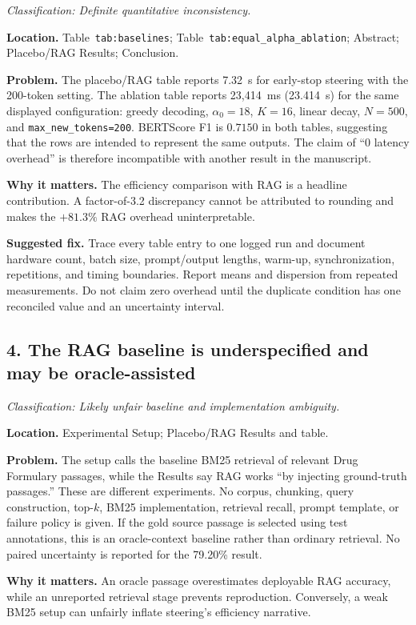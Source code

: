 \documentclass[11pt]{article}
\newcommand{\findinglabel}[1]{\textbf{#1}}
\newcommand{\classification}[1]{\textit{Classification: #1.}}
\begin{document}
\classification{Definite quantitative inconsistency}

\findinglabel{Location.} Table~\texttt{tab:baselines}; Table~\texttt{tab:equal\_alpha\_ablation}; Abstract; Placebo/RAG Results; Conclusion.

\findinglabel{Problem.} The placebo/RAG table reports 7.32~s for early-stop steering with the 200-token setting.  The ablation table reports 23,414~ms (23.414~s) for the same displayed configuration: greedy decoding, $\alpha_0=18$, $K=16$, linear decay, $N=500$, and \texttt{max\_new\_tokens=200}.  BERTScore F1 is $0.7150$ in both tables, suggesting that the rows are intended to represent the same outputs.  The claim of ``0 latency overhead'' is therefore incompatible with another result in the manuscript.

\findinglabel{Why it matters.} The efficiency comparison with RAG is a headline contribution.  A factor-of-3.2 discrepancy cannot be attributed to rounding and makes the $+81.3\%$ RAG overhead uninterpretable.

\findinglabel{Suggested fix.} Trace every table entry to one logged run and document hardware count, batch size, prompt/output lengths, warm-up, synchronization, repetitions, and timing boundaries.  Report means and dispersion from repeated measurements.  Do not claim zero overhead until the duplicate condition has one reconciled value and an uncertainty interval.

\subsection*{4. The RAG baseline is underspecified and may be oracle-assisted}

\classification{Likely unfair baseline and implementation ambiguity}

\findinglabel{Location.} Experimental Setup; Placebo/RAG Results and table.

\findinglabel{Problem.} The setup calls the baseline BM25 retrieval of relevant Drug Formulary passages, while the Results say RAG works ``by injecting ground-truth passages.''  These are different experiments.  No corpus, chunking, query construction, top-$k$, BM25 implementation, retrieval recall, prompt template, or failure policy is given.  If the gold source passage is selected using test annotations, this is an oracle-context baseline rather than ordinary retrieval.  No paired uncertainty is reported for the 79.20\% result.

\findinglabel{Why it matters.} An oracle passage overestimates deployable RAG accuracy, while an unreported retrieval stage prevents reproduction.  Conversely, a weak BM25 setup can unfairly inflate steering's efficiency narrative.
\end{document}
